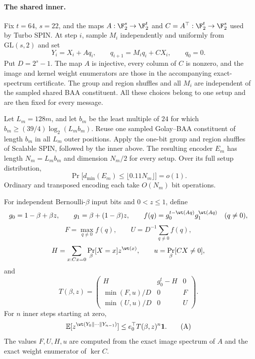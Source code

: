 
\paragraph{The shared inner.}
Fix $t=64$, $s=22$, and the maps $A:\F_2^s\to\F_2^t$ and
$C=A^\top:\F_2^t\to\F_2^s$ used by Turbo SPIN. At step $i$, sample
$M_i$ independently and uniformly from $\mathrm{GL}(s,2)$ and set
\[
 Y_i=X_i+Aq_i,\qquad q_{i+1}=M_iq_i+CX_i,\qquad q_0=0.
\]
Put $D=2^s-1$. The map $A$ is injective, every column of $C$ is
nonzero, and the image and kernel weight enumerators are those in the
accompanying exact-spectrum certificate. The group and region shuffles and
all $M_i$ are independent of the sampled shared BAA constituent. All
these choices belong to one setup and are then fixed for every message.

\begin{theorem}
\label{thm:shared-inner-scalable}
Let $L_m=128m$, and let $b_m$ be the least multiple of $24$ for which
$b_m\ge(39/4)\log_2(L_mb_m)$. Reuse one sampled Golay--BAA
constituent of length $b_m$ in all $L_m$ outer positions. Apply the
one-bit group and region shuffles of Scalable SPIN, followed by the
inner above. The resulting encoder $E_m$ has length $N_m=L_mb_m$ and
dimension $N_m/2$ for every setup. Over its full setup distribution,
\[
 \Pr\bigl[d_{\min}(E_m)\le\lfloor0.11N_m\rfloor\bigr]=o(1).
\]
Ordinary and transposed encoding each take $O(N_m)$ bit operations.
\end{theorem}

\begin{lemma}
\label{lem:shared-inner-weighted-envelope}
For independent Bernoulli-$\beta$ input bits and $0<z\le1$, define
\[
 g_0=1-\beta+\beta z,\qquad g_1=\beta+(1-\beta)z,\qquad
 f(q)=g_0^{t-\wt(Aq)}g_1^{\wt(Aq)}\quad(q\ne0),
\]
\[
 F=\max_{q\ne0}f(q),\qquad U=D^{-1}\sum_{q\ne0}f(q),
\]
\[
 H=\sum_{x:Cx=0}\Pr_\beta[X=x]z^{\wt(x)},\qquad
 u=\Pr_\beta[CX\ne0],
\]
and
\[
 T(\beta,z)=
 \begin{pmatrix}
 H&g_0^t-H&0\\
 \min(F,u)/D&0&F\\
 \min(U,u)/D&0&U
 \end{pmatrix}.
\]
For $n$ inner steps starting at zero,
\[
 \mathbb E[z^{\wt(Y_0\Vert\cdots\Vert Y_{n-1})}]
 \le e_0^\top T(\beta,z)^n\mathbf1.
 \tag{A}
\]
The values $F,U,H,u$ are computed from the exact image spectrum of
$A$ and the exact weight enumerator of $\ker C$.
\end{lemma}

